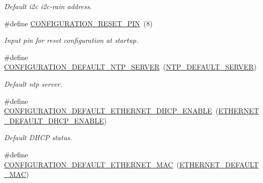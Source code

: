 \begin{DoxyCompactItemize}
\begin{DoxyCompactList}\small\item\em Default i2c i2c-\/rain address. \end{DoxyCompactList}\item 
\mbox{\label{rmap-config_8h_ae90da4786d4ba14563681879dba4d39c}} 
\#define \hyperlink{rmap-config_8h_ae90da4786d4ba14563681879dba4d39c}{C\+O\+N\+F\+I\+G\+U\+R\+A\+T\+I\+O\+N\+\_\+\+R\+E\+S\+E\+T\+\_\+\+P\+IN}~(8)
\begin{DoxyCompactList}\small\item\em Input pin for reset configuration at startup. \end{DoxyCompactList}\item 
\mbox{\label{rmap-config_8h_ad5f167ef5dab674e29cea328f672e0a3}} 
\#define \hyperlink{rmap-config_8h_ad5f167ef5dab674e29cea328f672e0a3}{C\+O\+N\+F\+I\+G\+U\+R\+A\+T\+I\+O\+N\+\_\+\+D\+E\+F\+A\+U\+L\+T\+\_\+\+N\+T\+P\+\_\+\+S\+E\+R\+V\+ER}~(\hyperlink{ntp__config_8h_ac2609c1adfd1a279c59fed52b5827fd3}{N\+T\+P\+\_\+\+D\+E\+F\+A\+U\+L\+T\+\_\+\+S\+E\+R\+V\+ER})
\begin{DoxyCompactList}\small\item\em Default ntp server. \end{DoxyCompactList}\item 
\mbox{\label{rmap-config_8h_aedfe334cb469b9ad487a0ba637d29662}} 
\#define \hyperlink{rmap-config_8h_aedfe334cb469b9ad487a0ba637d29662}{C\+O\+N\+F\+I\+G\+U\+R\+A\+T\+I\+O\+N\+\_\+\+D\+E\+F\+A\+U\+L\+T\+\_\+\+E\+T\+H\+E\+R\+N\+E\+T\+\_\+\+D\+H\+C\+P\+\_\+\+E\+N\+A\+B\+LE}~(\hyperlink{ethernet__config_8h_a6d72f280384bb90ffd7c78bb188dd6ad}{E\+T\+H\+E\+R\+N\+E\+T\+\_\+\+D\+E\+F\+A\+U\+L\+T\+\_\+\+D\+H\+C\+P\+\_\+\+E\+N\+A\+B\+LE})
\begin{DoxyCompactList}\small\item\em Default D\+H\+CP status. \end{DoxyCompactList}\item 
\mbox{\label{rmap-config_8h_a5333d2c3bcda84cc19a56f3ab7a2bcce}} 
\#define \hyperlink{rmap-config_8h_a5333d2c3bcda84cc19a56f3ab7a2bcce}{C\+O\+N\+F\+I\+G\+U\+R\+A\+T\+I\+O\+N\+\_\+\+D\+E\+F\+A\+U\+L\+T\+\_\+\+E\+T\+H\+E\+R\+N\+E\+T\+\_\+\+M\+AC}~(\hyperlink{ethernet__config_8h_aec01256edf75fe9fc49e47cd1e5954f6}{E\+T\+H\+E\+R\+N\+E\+T\+\_\+\+D\+E\+F\+A\+U\+L\+T\+\_\+\+M\+AC})

\end{DoxyCompactItemize}
